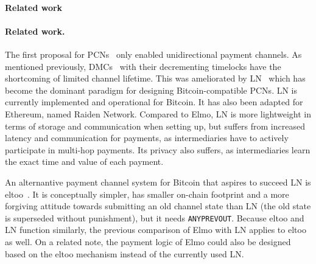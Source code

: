 \makeatletter%
%
  {\paragraph{Related work}}%
  {\paragraph{Related work.}}%
\makeatother%
 The first proposal for PCNs~\cite{spilman} only enabled
 unidirectional payment channels. As mentioned previously, DMCs~\cite{decker}
 with their decrementing timelocks have the shortcoming of limited channel
 lifetime. This was ameliorated by LN~\cite{lightning} which has become the dominant paradigm for designing Bitcoin-compatible PCNs.
 LN is currently implemented and operational for
  Bitcoin. It has also been adapted for Ethereum, named
  Raiden Network. Compared to Elmo, LN is more lightweight in terms of
  storage and communication when setting up, but suffers from increased latency
  and communication for payments, as intermediaries have to actively participate
  in multi-hop payments. Its privacy also suffers, as intermediaries
  learn the exact time and value of each payment.

%
%

  An alternantive payment channel system for Bitcoin that aspires to
  succeed LN is eltoo~\cite{eltoo}. It is conceptually simpler,
  has smaller on-chain footprint and a more forgiving attitude towards
  submitting an old channel state than LN (the old state is superseded without punishment), but it needs
  \texttt{ANYPREVOUT}. Because eltoo and LN function similarly, the previous comparison of
  Elmo with LN applies to eltoo as well. On a related note, the payment
  logic of Elmo could also be designed based on the eltoo mechanism instead of
  the currently used LN.


